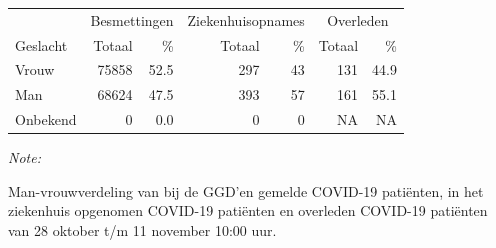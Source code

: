 \documentclass[
  english,
  man,floatsintext]{apa6}
\begin{document}
\begin{table}
\centering\begingroup\fontsize{11}{13}\selectfont

\begin{threeparttable}
\begin{tabular}{lrrrrrr}
\toprule
\multicolumn{1}{c}{ } & \multicolumn{2}{c}{Besmettingen} & \multicolumn{2}{c}{Ziekenhuisopnames} & \multicolumn{2}{c}{Overleden} \\
\cmidrule(l{3pt}r{3pt}){2-3} \cmidrule(l{3pt}r{3pt}){4-5} \cmidrule(l{3pt}r{3pt}){6-7}
Geslacht & Totaal & \% & Totaal & \% & Totaal & \%\\
\midrule
Vrouw & 75858 & 52.5 & 297 & 43 & 131 & 44.9\\
Man & 68624 & 47.5 & 393 & 57 & 161 & 55.1\\
Onbekend & 0 & 0.0 & 0 & 0 & NA & NA\\
\bottomrule
\end{tabular}
\begin{tablenotes}
\item \textit{Note: } 
\item Man-vrouwverdeling van bij de GGD’en gemelde COVID-19 patiënten, in het ziekenhuis opgenomen COVID-19 patiënten en overleden COVID-19 patiënten van 28 oktober t/m 11 november 10:00 uur.
\end{tablenotes}
\end{threeparttable}
\endgroup{}
\end{table}
\newpage
\end{document}
